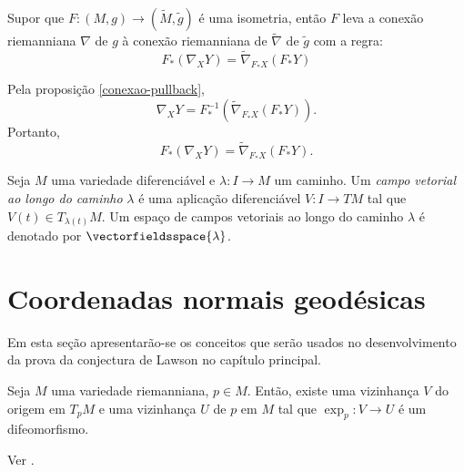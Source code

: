 \begin{proposicao}
	Supor que $F: (M,g) \rightarrow (\tilde{M}, \tilde{g})$ é uma isometria, então $F$ leva a conexão riemanniana $\nabla$ de $g$ à conexão riemanniana de $\tilde{\nabla}$ de $\tilde{g}$ com a regra:
	\begin{equation*}
		F_* (\nabla_X Y) = \tilde{\nabla}_{F_* X} (F_* Y)
	\end{equation*}
\end{proposicao}

\begin{demonstracao}
	Pela proposição \ref{conexao-pullback}, 
	\begin{equation*}
		\nabla_X Y = F^{-1}_* \left( \tilde{\nabla}_{F_* X} (F_* Y) \right).
	\end{equation*}
	Portanto,
	\begin{equation*}
		F_* (\nabla_X Y) = \tilde{\nabla}_{F_* X} (F_* Y).
	\end{equation*}
\end{demonstracao}

\begin{definicao}
	Seja $M$ uma variedade diferenciável e
	$\lambda: I \rightarrow M$ um caminho.
	Um \emph{campo vetorial ao longo do caminho} $\lambda$ é uma aplicação diferenciável $V: I \rightarrow TM$ tal que $V(t) \in T_{\lambda(t)} M$.
	Um espaço de campos vetoriais ao longo do caminho $\lambda$ é denotado por $\vectorfieldsspace{\lambda}$.
\end{definicao}



\section{Coordenadas normais geodésicas}

Em esta seção apresentarão-se os conceitos que serão usados no desenvolvimento da prova da conjectura de Lawson no capítulo principal.

\begin{lema}\label{lema:vizinhanca-normal}
	Seja
	$M$ uma variedade riemanniana,
	$p \in M$.
	Então, existe uma vizinhança $V$ do origem em $T_p M$ e uma vizinhança $U$ de $p$ em $M$ tal que $\exp_p: V \rightarrow U$ é um difeomorfismo.
\end{lema}

\begin{demonstracao}
	Ver \cite[Lemma 5.10]{Lee1997}.
\end{demonstracao}

